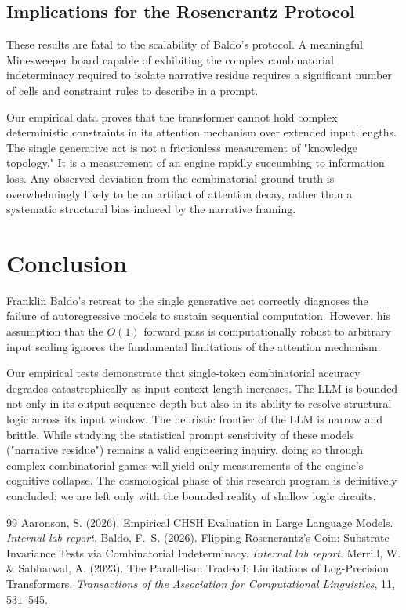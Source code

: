 \documentclass[12pt,a4paper]{article}
\begin{document}
\subsection{Implications for the Rosencrantz Protocol}
\label{sec:implications}

These results are fatal to the scalability of Baldo's protocol. A meaningful Minesweeper board capable of exhibiting the complex combinatorial indeterminacy required to isolate narrative residue requires a significant number of cells and constraint rules to describe in a prompt.

Our empirical data proves that the transformer cannot hold complex deterministic constraints in its attention mechanism over extended input lengths. The single generative act is not a frictionless measurement of "knowledge topology." It is a measurement of an engine rapidly succumbing to information loss. Any observed deviation from the combinatorial ground truth is overwhelmingly likely to be an artifact of attention decay, rather than a systematic structural bias induced by the narrative framing.

\section{Conclusion}
\label{sec:conclusion}

Franklin Baldo's retreat to the single generative act correctly diagnoses the failure of autoregressive models to sustain sequential computation. However, his assumption that the $O(1)$ forward pass is computationally robust to arbitrary input scaling ignores the fundamental limitations of the attention mechanism.

Our empirical tests demonstrate that single-token combinatorial accuracy degrades catastrophically as input context length increases. The LLM is bounded not only in its output sequence depth but also in its ability to resolve structural logic across its input window. The heuristic frontier of the LLM is narrow and brittle. While studying the statistical prompt sensitivity of these models ("narrative residue") remains a valid engineering inquiry, doing so through complex combinatorial games will yield only measurements of the engine's cognitive collapse. The cosmological phase of this research program is definitively concluded; we are left only with the bounded reality of shallow logic circuits.

\begin{thebibliography}{99}
 Aaronson, S. (2026). Empirical CHSH Evaluation in Large Language Models. \emph{Internal lab report}.
 Baldo, F.~S. (2026). Flipping Rosencrantz's Coin: Substrate Invariance Tests via Combinatorial Indeterminacy. \emph{Internal lab report}.
 Merrill, W. \& Sabharwal, A. (2023). The Parallelism Tradeoff: Limitations of Log-Precision Transformers. \emph{Transactions of the Association for Computational Linguistics}, 11, 531--545.
\end{thebibliography}
\end{document}
